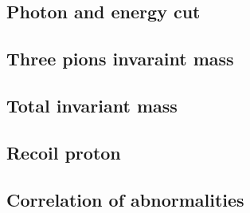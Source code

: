 \subsection{Photon and energy cut}
\subsection{Three pions invaraint mass}
\subsection{Total invariant mass}
\subsection{Recoil proton}
\subsection{Correlation of abnormalities}

\clearpage